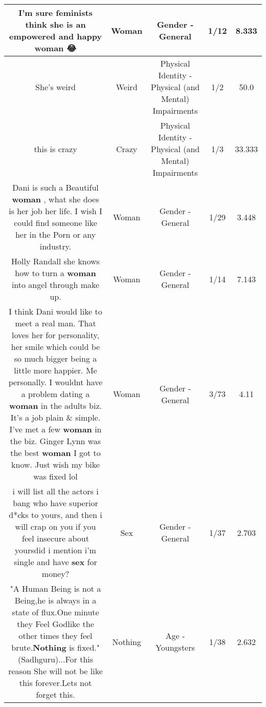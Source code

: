 \documentclass[11pt]{article}
\newlength\mylength
\begin{document}
\begin{center}
\begin{longtable}{|C{.65\mylength}|C{.30\mylength}|C{.12\mylength}|C{.12\mylength}|C{.12\mylength}|}
  \small I'm sure feminists think she is an empowered and happy \textbf{woman} 😂\normalsize   & Woman & Gender - General & 1/12 & 8.333 \\  \hline
  \small She's weird\normalsize   & Weird & Physical Identity - Physical (and Mental) Impairments & 1/2 & 50.0 \\  \hline
  \small this is crazy\normalsize   & Crazy & Physical Identity - Physical (and Mental) Impairments & 1/3 & 33.333 \\  \hline
  \small Dani is such a Beautiful \textbf{woman} , what she does is her job her life. I wish I could find someone like her in the Porn or any industry.\normalsize   & Woman & Gender - General & 1/29 & 3.448 \\  \hline
  \small Holly Randall she knows how to turn a \textbf{woman} into angel through make up.\normalsize   & Woman & Gender - General & 1/14 & 7.143 \\  \hline
  \small I think Dani would like to meet a real man. That loves her for personality, her smile which could be so much bigger being a little more happier. Me personally. I wouldnt have a problem dating a \textbf{woman} in the adults biz. It's a job plain \& simple. I've met a few \textbf{woman} in the biz. Ginger Lynn was the best \textbf{woman} I got to know. Just wish my bike was fixed lol\normalsize   & Woman & Gender - General & 3/73 & 4.11 \\  \hline
  \small i will list all the actors i bang who have superior d*cks to yours, and then i will crap on you if you feel insecure about yoursdid i mention i'm single and have \textbf{sex} for money?\normalsize   & Sex & Gender - General & 1/37 & 2.703 \\  \hline
  \small "A Human Being is not a Being,he is always in a state of flux.One minute they Feel Godlike the other times they feel brute.\textbf{Nothing} is fixed."(Sadhguru)...For this reason She will not be like this forever.Lets not forget this.\normalsize   & Nothing & Age - Youngsters & 1/38 & 2.632 \\  \hline

\end{longtable}
\end{center}
\end{document}
